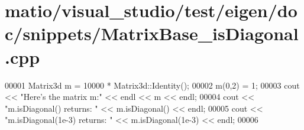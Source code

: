\hypertarget{matio_2visual__studio_2test_2eigen_2doc_2snippets_2_matrix_base__is_diagonal_8cpp_source}{}\section{matio/visual\+\_\+studio/test/eigen/doc/snippets/\+Matrix\+Base\+\_\+is\+Diagonal.cpp}
\label{matio_2visual__studio_2test_2eigen_2doc_2snippets_2_matrix_base__is_diagonal_8cpp_source}

\begin{DoxyCode}
00001 Matrix3d m = 10000 * Matrix3d::Identity();
00002 m(0,2) = 1;
00003 cout << \textcolor{stringliteral}{"Here's the matrix m:"} << endl << m << endl;
00004 cout << \textcolor{stringliteral}{"m.isDiagonal() returns: "} << m.isDiagonal() << endl;
00005 cout << \textcolor{stringliteral}{"m.isDiagonal(1e-3) returns: "} << m.isDiagonal(1e-3) << endl;
00006 
\end{DoxyCode}

